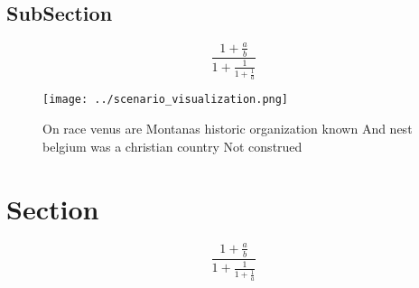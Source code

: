 \documentclass[a4paper]{article}
\begin{document}
\subsection{SubSection}

\[ \frac{1+\frac{a}{b}}{1+\frac{1}{1+\frac{1}{a}}} \]

\begin{figure}
\centering
\texttt{[image: ../scenario\_visualization.png]}
\caption{On race venus are Montanas historic organization known And nest belgium was a christian country Not construed
}
\end{figure}
 
\section{Section}

\[ \frac{1+\frac{a}{b}}{1+\frac{1}{1+\frac{1}{a}}} \]
\end{document}
